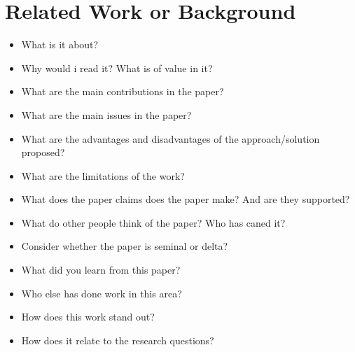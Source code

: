 \chapter{Related Work or Background}\label{ch_background}









\begin{itemize}
	\item What is it about?
	\item Why would i read it? What is of value in it?
	\item What are the main contributions in the paper?
	\item What are the main issues in the paper?
	\item What are the advantages and disadvantages of the approach/solution proposed?
	\item What are the limitations of the work?
	\item What does the paper claims does the paper make? And are they supported?
	\item What do other people think of the paper? Who has caned it?
	\item Consider whether the paper is seminal or delta?
	\item What did you learn from this paper?
	\item Who else has done work in this area?
	\item How does this work stand out?
	\item How does it relate to the research questions?
\end{itemize}








